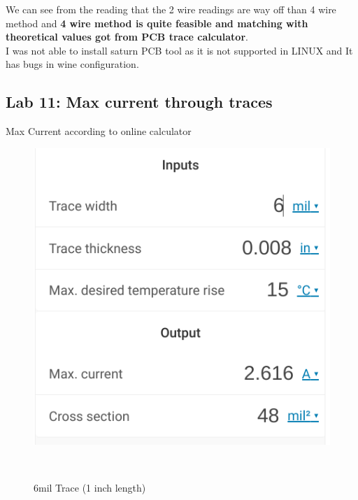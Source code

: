 \documentclass[a4paper,11pt]{article}%
\begin{document}
We can see from the reading that the 2 wire readings are way off than 4 wire method and \textbf{4 wire method is quite feasible and matching with theoretical values got from PCB trace calculator}.\\

I was not able to install saturn PCB tool as it is not supported in LINUX and It has bugs in wine configuration.


\subsection{Lab 11: Max current through traces}

Max Current according to online calculator\\
\begin{figure}[H]
	\centering
	\begin{minipage}[b]{0.45\linewidth}
		\includegraphics[scale=0.4]{figures/6_c}
		\caption{6mil Trace (1 inch length) }
	\end{minipage}
	\
	\begin{minipage}[b]{0.45\linewidth}

\end{minipage}
\end{figure}
\end{document}
